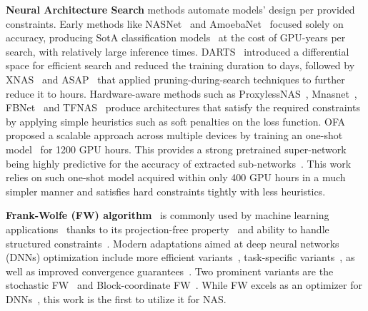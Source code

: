 \documentclass[dvipsnames,table,xcdraw]{article}
\begin{document}
\textbf{Neural Architecture Search} methods automate models' design per provided constraints. Early methods like NASNet~\cite{zoph2016neural} and AmoebaNet~\cite{real2019regularized} focused solely on accuracy, producing SotA classification models~\cite{huang2019gpipe} at the cost of GPU-years per search, with relatively large inference times. DARTS~\cite{liu2018darts} introduced a differential space for efficient search and reduced the training duration to days, followed by XNAS~\cite{nayman2019xnas} and ASAP~\cite{noy2020asap} that applied pruning-during-search techniques to further reduce it to hours. 
Hardware-aware methods such as ProxylessNAS~\cite{cai2018proxylessnas}, Mnasnet~\cite{tan2019mnasnet}, FBNet~\cite{fbnet} and TFNAS~\cite{TF-NAS} 
produce architectures that satisfy the required constraints by applying simple heuristics such as soft penalties on the loss function.
OFA~\cite{OFA} proposed a scalable approach across multiple devices by training an one-shot model~\cite{brock2017smash,bender2018understanding} for 1200 GPU hours. This provides a strong pretrained super-network being highly predictive for the accuracy of extracted sub-networks~\cite{SPOS,fairnas,yu2020train}. This work relies on such one-shot model acquired within only 400 GPU hours in a much simpler manner and satisfies hard constraints tightly with less heuristics.



\textbf{Frank-Wolfe (FW) algorithm}~\cite{frank_wolfe} 
is commonly used by machine learning applications~\cite{sun2019survey} thanks to its projection-free property~\cite{combettes2020projection,hazan2020faster} and ability to handle structured constraints~\cite{jaggi2013revisiting}. Modern adaptations aimed at deep neural networks (DNNs) optimization include more efficient variants~\cite{zhang2020quantized,combettes2020projection}, task-specific variants~\cite{chen2020frank,tsiligkaridis2020frank}, as well as improved convergence guarantees~\cite{lacoste2015global,d2020global}. Two prominent variants are the stochastic FW~\cite{hazan2016variance} and Block-coordinate FW~\cite{lacoste2013block}.
While FW excels as an optimizer for DNNs~\cite{berrada2018deep,pokutta2020deep}, this work is the first to utilize it for NAS.





\end{document}
